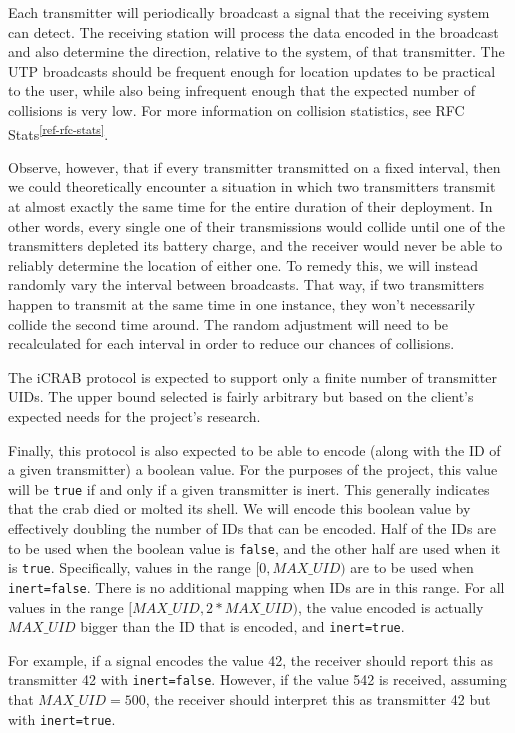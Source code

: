\documentclass[12pt,hidelinks]{article}
\newcommand{\fastcite}[1]{\textsuperscript{\ref{#1}}}
\begin{document}
Each transmitter will periodically broadcast a signal that the receiving
system can detect.
The receiving station will process the data encoded in the broadcast and
also determine the direction, relative to the system, of that transmitter.
The UTP broadcasts should be frequent enough for location updates to be
practical to the user, while also being
infrequent enough that the expected number of collisions is very low.
For more information on collision statistics, see
RFC Stats\fastcite{ref-rfc-stats}.

Observe, however, that if every transmitter transmitted on a fixed interval,
then we could theoretically encounter a situation in which two transmitters
transmit at almost exactly the same time for the entire duration of their
deployment.
In other words, every single one of their transmissions would collide
until one of the transmitters depleted its battery charge, and the receiver
would never be able to reliably determine the location of either one.
To remedy this, we will instead randomly vary the interval between broadcasts.
That way, if two transmitters happen to transmit at the same time in one
instance, they won't necessarily collide the second time around.
The random adjustment will need to be recalculated for each interval in order
to reduce our chances of collisions.

The iCRAB protocol is expected to support only a finite number of transmitter
UIDs.
The upper bound selected is fairly arbitrary but based on the client's expected
needs for the project's research.

Finally, this protocol is also expected to be able to encode (along with the
ID of a given transmitter) a boolean value.
For the purposes of the project, this value will be \texttt{true}
if and only if a given  transmitter is inert.
This generally indicates that the crab died or molted its shell.
We will encode this boolean value by effectively doubling the number of IDs
that can be encoded.
Half of the IDs are to be used when the boolean value is \texttt{false},
and the other half are used when it is \texttt{true}.
Specifically, values in the range $[0, MAX\_UID)$ are to be used when
\texttt{inert=false}.
There is no additional mapping when IDs are in this range.
For all values in the range $[MAX\_UID, 2*MAX\_UID)$, the value encoded is
actually $MAX\_UID$ bigger than the ID that is encoded, and
\texttt{inert=true}.

For example, if a signal encodes the value 42, the receiver should report
this as transmitter 42 with \texttt{inert=false}.
However, if the value 542 is received, assuming that $MAX\_UID=500$,
the receiver should interpret this as transmitter 42 but with
\texttt{inert=true}.
\end{document}
